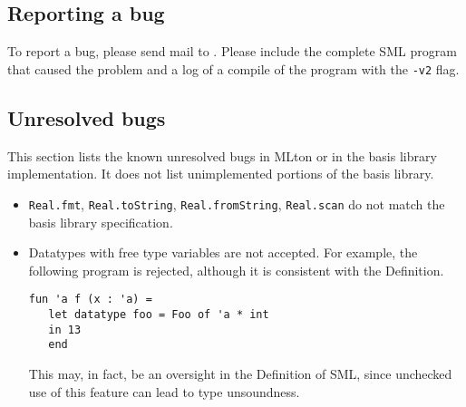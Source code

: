 
\subsection{Reporting a bug}

To report a bug, please send mail to {\mltonmail}.  Please include the
complete SML program that caused the problem and a log of a compile of
the program with the {\tt -v2} flag.

\subsection{Unresolved bugs}

This section lists the known unresolved bugs in MLton or in the basis
library implementation.  It does not list unimplemented portions of
the basis library.

\begin{itemize}

\item
{\tt Real.fmt}, {\tt Real.toString}, {\tt Real.fromString},
{\tt Real.scan}
do not match the basis library specification.

\item
Datatypes with free type variables are not accepted.  For example,
the following program is rejected, although it is consistent with the
Definition.
\begin{verbatim}
fun 'a f (x : 'a) =
   let datatype foo = Foo of 'a * int
   in 13
   end
\end{verbatim}
This may, in fact, be an oversight in the Definition of SML, since
unchecked use of this feature can lead to type unsoundness.

\end{itemize}
